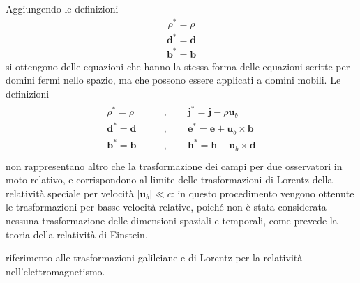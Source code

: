 \documentclass[letterpaper,10pt,italian]{jupyterBook}
\begin{document}
\sphinxAtStartPar
Aggiungendo le definizioni
\begin{equation*}
\begin{split}\rho^* = \rho\end{split}
\end{equation*}\begin{equation*}
\begin{split}\mathbf{d}^* = \mathbf{d}\end{split}
\end{equation*}\begin{equation*}
\begin{split}\mathbf{b}^* = \mathbf{b}\end{split}
\end{equation*}
\sphinxAtStartPar
si ottengono delle equazioni che hanno la stessa forma delle equazioni scritte per domini fermi nello spazio, ma che possono essere applicati a domini mobili. Le definizioni
\begin{equation*}
\begin{split}\begin{aligned}
\rho^* = \rho \qquad & , \qquad \mathbf{j}^* = \mathbf{j} - \rho \mathbf{u}_b \\
\mathbf{d}^* = \mathbf{d} \qquad & , \qquad \mathbf{e}^* = \mathbf{e} + \mathbf{u}_b \times \mathbf{b} \\
\mathbf{b}^* = \mathbf{b} \qquad & , \qquad \mathbf{h}^* = \mathbf{h} - \mathbf{u}_b \times \mathbf{d} \\
\end{aligned}\end{split}
\end{equation*}
\sphinxAtStartPar
non rappresentano altro che la trasformazione dei campi per due osservatori in moto relativo, e corrispondono al limite delle trasformazioni di Lorentz della relatività speciale per velocità \(|\mathbf{u}_b| \ll c\): in questo procedimento vengono ottenute le trasformazioni per basse velocità relative, poiché non è stata considerata nessuna trasformazione delle dimensioni spaziali e temporali, come prevede la teoria della relatività di Einstein.

\sphinxAtStartPar
{} riferimento alle trasformazioni galileiane e di Lorentz per la relatività nell’elettromagnetismo.

\sphinxstepscope
\end{document}
